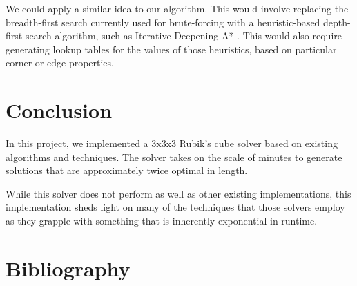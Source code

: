 \documentclass{article}
\begin{document}
We could apply a similar idea to our algorithm. This would involve replacing the breadth-first search currently used for brute-forcing with a heuristic-based depth-first search algorithm, such as Iterative Deepening A* \cite{ida}. This would also require generating lookup tables for the values of those heuristics, based on particular corner or edge properties.

\section{Conclusion}
In this project, we implemented a 3x3x3 Rubik's cube solver based on existing algorithms and techniques. The solver takes on the scale of minutes to generate solutions that are approximately twice optimal in length.

While this solver does not perform as well as other existing implementations, this implementation sheds light on many of the techniques that those solvers employ as they grapple with something that is inherently exponential in runtime.

\section{Bibliography}
\printbibliography[heading=none]


\end{document}

